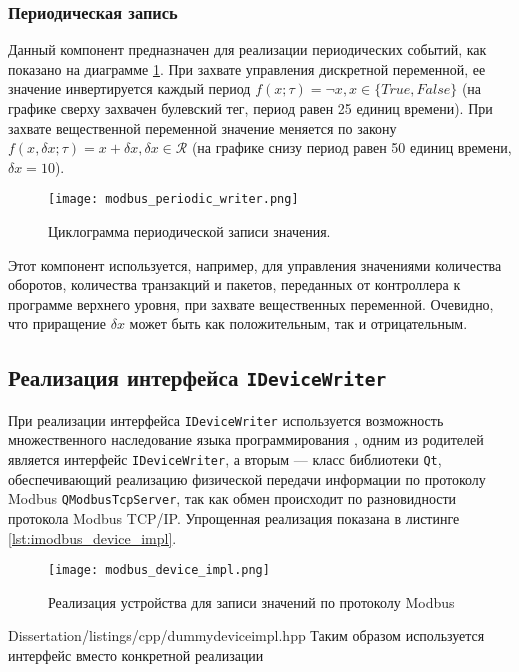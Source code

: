 \subsubsection{Периодическая запись}
Данный компонент предназначен для реализации периодических событий, как показано на диаграмме \ref{fig:modbus_periodic_writer}.
При захвате управления дискретной переменной, ее значение инвертируется каждый период $f(x; \tau) = \lnot x, x \in \{True, False\}$
(на графике сверху захвачен булевский тег, период равен 25 единиц времени).
При захвате вещественной переменной значение меняется по закону $f(x,\delta x; \tau) = x + \delta x, \delta x \in \mathcal{R}$
(на графике снизу период равен 50 единиц времени, $\delta x = 10$).
\begin{center}
    \begin{figure}[h!]
        \texttt{[image: modbus\_periodic\_writer.png]}
        \caption{Циклограмма периодической записи значения.}\label{fig:modbus_periodic_writer}
    \end{figure}
\end{center}
Этот компонент используется, например, для управления значениями количества оборотов,
количества транзакций и пакетов, переданных от контроллера к программе верхнего уровня,
при захвате вещественных переменной.
Очевидно, что приращение $\delta x$ может быть как положительным, так и отрицательным.


\subsection{Реализация интерфейса \texttt{IDeviceWriter}}
При реализации интерфейса \texttt{IDeviceWriter} используется возможность множественного наследование языка программирования \cpp,
одним из родителей является интерфейс \texttt{IDeviceWriter},
а вторым --- класс библиотеки \texttt{Qt}, обеспечивающий реализацию физической передачи информации по протоколу Modbus
\texttt{QModbusTcpServer}, так как обмен происходит по разновидности протокола Modbus TCP/IP.
Упрощенная реализация показана в листинге \ref{lst:imodbus_device_impl}.
\begin{center}
    \begin{figure}
        \texttt{[image: modbus\_device\_impl.png]}
        \caption{Реализация устройства для записи значений по протоколу Modbus}\label{fig:modbus_device_imp}
    \end{figure}
\end{center}

        {Dissertation/listings/cpp/dummydeviceimpl.hpp}
Таким образом используется интерфейс вместо конкретной реализации \cite[стр. 47-48]{book:pattern:head_first}


